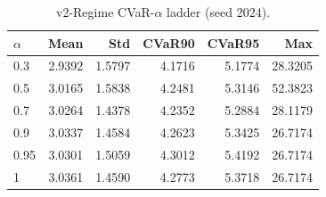 \begin{table}[H]
    \centering
    \caption{v2-Regime CVaR-$\alpha$ ladder (seed 2024).}
    \label{tab:v2_regime_alpha}
    \begin{tabular}{@{}lrrrrr@{}}
        \toprule
        $\alpha$ & Mean & Std & CVaR90 & CVaR95 & Max \\
        \midrule
        0.3 & 2.9392 & 1.5797 & 4.1716 & 5.1774 & 28.3205 \\
        0.5 & 3.0165 & 1.5838 & 4.2481 & 5.3146 & 52.3823 \\
        0.7 & 3.0264 & 1.4378 & 4.2352 & 5.2884 & 28.1179 \\
        0.9 & 3.0337 & 1.4584 & 4.2623 & 5.3425 & 26.7174 \\
        0.95 & 3.0301 & 1.5059 & 4.3012 & 5.4192 & 26.7174 \\
        1 & 3.0361 & 1.4590 & 4.2773 & 5.3718 & 26.7174 \\
        \bottomrule
    \end{tabular}
\end{table}
